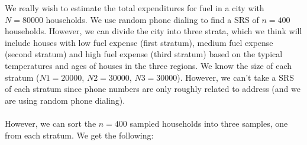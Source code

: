 \documentclass[12pt]{article}
\makeatletter
\theoremstyle{homework}
\newenvironment{exercise}[1]
{\def\@currentlabel{#1}\exercisecore}
{\endexercisecore}
\makeatother
\begin{document}
\begin{exercise}{3} We really wish to estimate the total expenditures for fuel in a city with
    $N = 80000$ households. We use random phone dialing to find a SRS of $n = 400$ households. 
    However, we can divide the city into three strata, which we think will include houses with 
    low fuel expense (first stratum), medium fuel expense (second stratum) and high fuel expense 
    (third stratum) based on the typical temperatures and ages of houses in the three regions. 
    We know the size of each stratum ($N1 = 20000$, $N2 = 30000$, $N3 = 30000$). 
    However, we can’t take a SRS of each stratum since phone numbers are only roughly related to 
    address (and we are using random phone dialing).\\\\
    However, we can sort the $n = 400$ sampled households into three samples, one from each stratum. We get the following:\\


\end{exercise}
\end{document}
